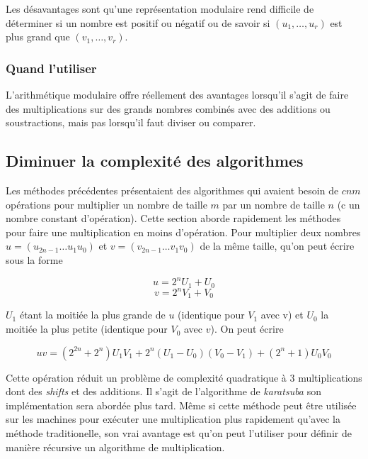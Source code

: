 \documentclass[letterpaper]{article}
\begin{document}
Les désavantages sont qu'une représentation modulaire rend difficile de
déterminer si un nombre est positif ou négatif ou de savoir si
$(u_1, \dots, u_r)$ est plus grand que $(v_1, \dots, v_r)$.


\subsubsection{Quand l'utiliser}

L'arithmétique modulaire offre réellement des avantages lorsqu'il s'agit de faire
des multiplications sur des grands nombres combinés avec des additions ou
soustractions, mais pas lorsqu'il faut diviser ou comparer.

\subsection{Diminuer la complexité des algorithmes}

Les méthodes précédentes présentaient des algorithmes qui avaient besoin de
$cnm$ opérations pour multiplier un nombre de taille $m$ par un nombre de
taille $n$ (c un nombre constant d'opération). Cette section aborde rapidement
les méthodes pour faire une multiplication en moins d'opération.
\newline
Pour multiplier deux nombres $u = (u_{2n-1} \dots u_1 u_0)$ et
$v = (v_{2n-1} \dots v_1 v_0)$ de la même taille, qu'on peut écrire sous la
forme

  $$u = 2^{n} U_1 + U_0$$
  $$v = 2^{n} V_1 + V_0$$

$U_1$ étant la moitiée la plus grande de $u$ (identique pour $V_1$ avec v) et
$U_0$ la moitiée la plus petite (identique pour $V_0$ avec $v$). On peut écrire

  $$uv = (2^{2n} + 2^n) U_1 V_1 + 2^n (U_1 - U_0) (V_0 - V_1) + (2^n + 1) U_0 V_0$$

Cette opération réduit un problème de complexité quadratique à 3 multiplications
dont des \emph{shifts} et des additions. Il s'agit de l'algorithme de
\emph{karatsuba} son implémentation sera abordée plus tard.
\newline
Même si cette méthode peut être utilisée sur les machines pour exécuter une
multiplication plus rapidement qu'avec la méthode traditionelle, son vrai
avantage est qu'on peut l'utiliser pour définir de manière récursive un
algorithme de multiplication.
\end{document}
